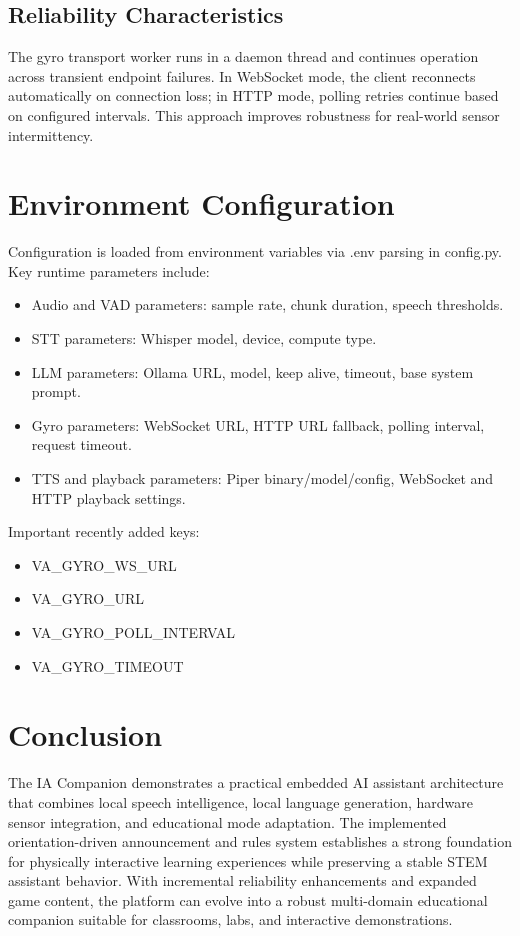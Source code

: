 \documentclass[12pt,a4paper]{article}
\begin{document}
\subsection{Reliability Characteristics}
The gyro transport worker runs in a daemon thread and continues operation across transient endpoint failures. In WebSocket mode, the client reconnects automatically on connection loss; in HTTP mode, polling retries continue based on configured intervals. This approach improves robustness for real-world sensor intermittency.

\section{Environment Configuration}
Configuration is loaded from environment variables via .env parsing in config.py. Key runtime parameters include:
\begin{itemize}
    \item Audio and VAD parameters: sample rate, chunk duration, speech thresholds.
    \item STT parameters: Whisper model, device, compute type.
    \item LLM parameters: Ollama URL, model, keep alive, timeout, base system prompt.
    \item Gyro parameters: WebSocket URL, HTTP URL fallback, polling interval, request timeout.
    \item TTS and playback parameters: Piper binary/model/config, WebSocket and HTTP playback settings.
\end{itemize}

Important recently added keys:
\begin{itemize}
    \item VA\_GYRO\_WS\_URL
    \item VA\_GYRO\_URL
    \item VA\_GYRO\_POLL\_INTERVAL
    \item VA\_GYRO\_TIMEOUT
\end{itemize}

\section{Conclusion}
The IA Companion demonstrates a practical embedded AI assistant architecture that combines local speech intelligence, local language generation, hardware sensor integration, and educational mode adaptation. The implemented orientation-driven announcement and rules system establishes a strong foundation for physically interactive learning experiences while preserving a stable STEM assistant behavior. With incremental reliability enhancements and expanded game content, the platform can evolve into a robust multi-domain educational companion suitable for classrooms, labs, and interactive demonstrations.
\end{document}
